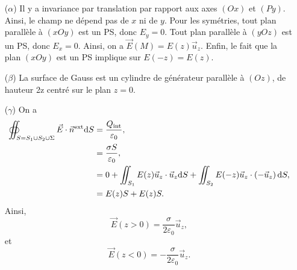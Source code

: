             \begin{itemize}
                \item [($\alpha$)] Il y a invariance par translation par rapport aux axes $(Ox)$ et $(Py)$. Ainsi, le champ ne dépend pas de $x$ ni de $y$. Pour les symétries, tout plan parallèle à $(xOy)$ est un PS, donc $E_y=0$. Tout plan parallèle à $(yOz)$ est un PS, donc $E_x=0$. Ainsi, on a $\vec{E}(M)=E(z)\vec{u}_z$.
                Enfin, le fait que la plan $(xOy)$ est un PS implique sur $E(-z)=E(z)$.

                \item [($\beta$)] La surface de Gauss est un cylindre de générateur parallèle à $(Oz)$, de hauteur 2z centré sur le plan $z=0$.
                
                \item [($\gamma$)] On a 
                \begin{align*}
                    \oiint_{S=S_1\cup S_2\cup \Sigma}\vec{E}\cdot\vec{n}^{\text{ext}}\mathrm{d} S
                    &=\frac{Q_{\text{int}}}{\varepsilon_0},\\
                    &=\frac{\sigma S}{\varepsilon_0},\\
                    &=0+\iint_{S_1}E(z)\vec{u}_z\cdot\vec{u}_z\mathrm{d} S+\iint_{S_2}E(-z)\vec{u}_z\cdot\left(-\vec{u}_z\right)\mathrm{d} S,\\
                    &=
                    E(z)S+E(z)S.
                \end{align*}
                Ainsi, 
                \begin{equation*}
                    \vec{E}(z>0)=\frac{\sigma}{2\varepsilon_0}\vec{u}_z,
                \end{equation*}
                et 
                \begin{equation*}
                    \vec{E}(z<0)=-\frac{\sigma}{2\varepsilon_0}\vec{u}_z.
                \end{equation*}
            \end{itemize}